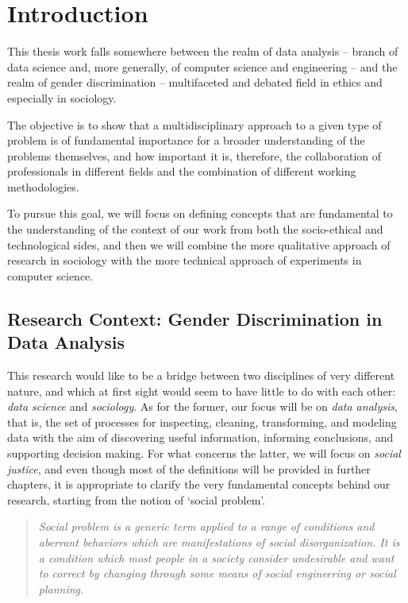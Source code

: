 \chapter{Introduction}
\label{chapter:introduction}
\thispagestyle{empty}

This thesis work falls somewhere between the realm of data analysis -- branch of data science and, more generally, of computer science and engineering -- and the realm of gender discrimination -- multifaceted and debated field in ethics and especially in sociology.

The objective is to show that a multidisciplinary approach to a given type of problem is of fundamental importance for a broader understanding of the problems themselves, and how important it is, therefore, the collaboration of professionals in different fields and the combination of different working methodologies.

To pursue this goal, we will focus on defining concepts that are fundamental to the understanding of the context of our work from both the socio-ethical and technological sides, and then we will combine the more qualitative approach of research in sociology with the more technical approach of experiments in computer science.


\section{Research Context: Gender Discrimination in Data Analysis}
This research would like to be a bridge between two disciplines of very different nature, and which at first sight would seem to have little to do with each other: \textit{data science} and \textit{sociology}. As for the former, our focus will be on \textit{data analysis}, that is, the set of processes for inspecting, cleaning, transforming, and modeling data with the aim of discovering useful information, informing conclusions, and supporting decision making. For what concerns the latter, we will focus on \textit{social justice}, and even though most of the definitions will be provided in further chapters, it is appropriate to clarify the very fundamental concepts behind our research, starting from the notion of `social problem'.
\begin{quote}\emph{Social problem is a generic term applied to a range of conditions and aberrant behaviors which are manifestations of social disorganization. It is a condition which most people in a society consider undesirable and want to correct by changing through some means of social engineering or social planning.} \cite{marschall1998oxford}\end{quote}

